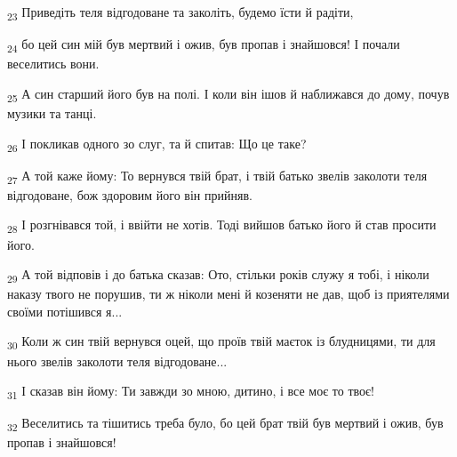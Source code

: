 \begin{tcolorbox}
\textsubscript{23} Приведіть теля відгодоване та заколіть, будемо їсти й радіти,
\end{tcolorbox}
\begin{tcolorbox}
\textsubscript{24} бо цей син мій був мертвий і ожив, був пропав і знайшовся! І почали веселитись вони.
\end{tcolorbox}
\begin{tcolorbox}
\textsubscript{25} А син старший його був на полі. І коли він ішов й наближався до дому, почув музики та танці.
\end{tcolorbox}
\begin{tcolorbox}
\textsubscript{26} І покликав одного зо слуг, та й спитав: Що це таке?
\end{tcolorbox}
\begin{tcolorbox}
\textsubscript{27} А той каже йому: То вернувся твій брат, і твій батько звелів заколоти теля відгодоване, бож здоровим його він прийняв.
\end{tcolorbox}
\begin{tcolorbox}
\textsubscript{28} І розгнівався той, і ввійти не хотів. Тоді вийшов батько його й став просити його.
\end{tcolorbox}
\begin{tcolorbox}
\textsubscript{29} А той відповів і до батька сказав: Ото, стільки років служу я тобі, і ніколи наказу твого не порушив, ти ж ніколи мені й козеняти не дав, щоб із приятелями своїми потішився я...
\end{tcolorbox}
\begin{tcolorbox}
\textsubscript{30} Коли ж син твій вернувся оцей, що проїв твій маєток із блудницями, ти для нього звелів заколоти теля відгодоване...
\end{tcolorbox}
\begin{tcolorbox}
\textsubscript{31} І сказав він йому: Ти завжди зо мною, дитино, і все моє то твоє!
\end{tcolorbox}
\begin{tcolorbox}
\textsubscript{32} Веселитись та тішитись треба було, бо цей брат твій був мертвий і ожив, був пропав і знайшовся!
\end{tcolorbox}
